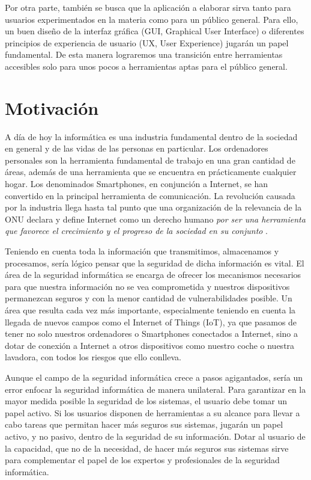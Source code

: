 Por otra parte, también se busca que la aplicación a elaborar sirva tanto para usuarios experimentados en la materia como para un público general. Para ello, un buen diseño de la interfaz gráfica (GUI, Graphical User Interface) o diferentes principios de experiencia de usuario (UX, User Experience) jugarán un papel fundamental. De esta manera lograremos una transición entre herramientas accesibles solo para unos pocos a herramientas aptas para el público general.

\section{Motivación}

A día de hoy la informática es una industria fundamental dentro de la sociedad en general y de las vidas de las personas en particular. Los ordenadores personales son la herramienta fundamental de trabajo en una gran cantidad de áreas, además de una herramienta que se encuentra en prácticamente cualquier hogar. Los denominados Smartphones, en conjunción a Internet, se han convertido en la principal herramienta de comunicación. La revolución causada por la industria llega hasta tal punto que una organización de la relevancia de la ONU declara y define Internet como un derecho humano \textit{por ser una herramienta que favorece el crecimiento y el progreso de la sociedad en su conjunto} \cite{onu-internet}.

Teniendo en cuenta toda la información que transmitimos, almacenamos y procesamos, sería lógico pensar que la seguridad de dicha información es vital. El área de la seguridad informática se encarga de ofrecer los mecanismos necesarios para que nuestra información no se vea comprometida y nuestros dispositivos permanezcan seguros y con la menor cantidad de vulnerabilidades posible. Un área que resulta cada vez más importante, especialmente teniendo en cuenta la llegada de nuevos campos como el Internet of Things (IoT), ya que pasamos de tener no solo nuestros ordenadores o Smartphones conectados a Internet, sino a dotar de conexión a Internet a otros dispositivos como nuestro coche o nuestra lavadora, con todos los riesgos que ello conlleva.

Aunque el campo de la seguridad informática crece a pasos agigantados, sería un error enfocar la seguridad informática de manera unilateral. Para garantizar en la mayor medida posible la seguridad de los sistemas, el usuario debe tomar un papel activo. Si los usuarios disponen de herramientas a su alcance para llevar a cabo tareas que permitan hacer más seguros sus sistemas, jugarán un papel activo, y no pasivo, dentro de la seguridad de su información. Dotar al usuario de la capacidad, que no de la necesidad, de hacer más seguros sus sistemas sirve para complementar el papel de los expertos y profesionales de la seguridad informática.